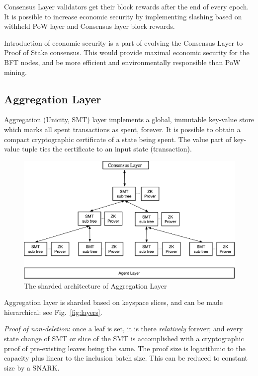 \documentclass{llncs}
\begin{document}
Consensus Layer validators get their block rewards after the end of every epoch. It is possible to increase economic security by implementing slashing based on withheld PoW layer and Consensus layer block rewards.

Introduction of economic security is a part of evolving the Consensus Layer to Proof of Stake consensus. This would provide maximal economic security for the BFT nodes, and be more efficient and environmentally responsible than PoW mining.

\subsection{Aggregation Layer}

Aggregation (Unicity, SMT) layer implements a global, immutable key-value store which marks all spent transactions as spent, forever. It is possible to obtain a compact cryptographic certificate of a state being spent. The value part of key-value tuple ties the certificate to an input state (transaction).

\begin{figure}[!htbp]
    \begin{center}
        \includegraphics[width=.9\textwidth]{pic/layers}
    \caption{The sharded architecture of Aggregation Layer}\label{fig:sharding}
    \end{center}
\end{figure}

Aggregation layer is sharded based on keyspace slices, and can be made hierarchical: see Fig.~\ref{fig:layers}.

\emph{Proof of non-deletion}: once a leaf is set, it is there \emph{relatively} forever; and every state change of SMT or slice of the SMT is accomplished with a cryptographic proof of pre-existing leaves being the same. The proof size is logarithmic to the capacity plus linear to the inclusion batch size. This can be reduced to constant size by a SNARK.
\end{document}
